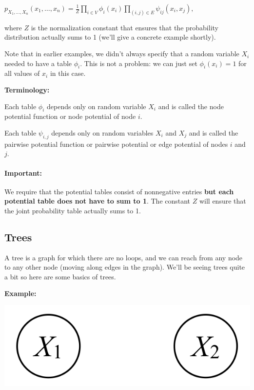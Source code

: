 \documentclass[6008notes.tex]{subfiles}
\begin{document}
{\centering$p_{X_1, \dots , X_ n}(x_1, \dots , x_ n) =\frac{1}{Z}\prod _{i\in V}\phi _{i}(x_{i})\prod _{(i,j)\in E}\psi _{ij}(x_{i},x_{j}),$ \par}

where $Z$ is the normalization constant that ensures that the probability distribution actually sums to 1 (we'll give a concrete example shortly).

Note that in earlier examples, we didn't always specify that a random variable $X_i$ needed to have a table $\phi_i$. This is not a problem: we can just set $\phi_i(x_i) = 1$ for all values of $x_i$ in this case.

\textbf{Terminology:}

Each table $\phi_i$ depends only on random variable $X_i$ and is called the node potential function or node potential of node $i$.

Each table $\psi_{i, j}$ depends only on random variables $X_i$ and $X_j$ and is called the pairwise potential function or pairwise potential or edge potential of nodes $i$ and $j$.

\paragraph{Important:} We require that the potential tables consist of nonnegative entries \textbf{but each potential table does not have to sum to 1}. The constant $Z$ will ensure that the joint probability table actually sums to 1.


\subsection{Trees}

A tree is a graph for which there are no loops, and we can reach from any node to any other node (moving along edges in the graph). We'll be seeing trees quite a bit so here are some basics of trees.

\textbf{Example:}

{\centering\includegraphics[scale=0.4]{images_sec-graphical-models-2-rv-indep} \par}
\end{document}
